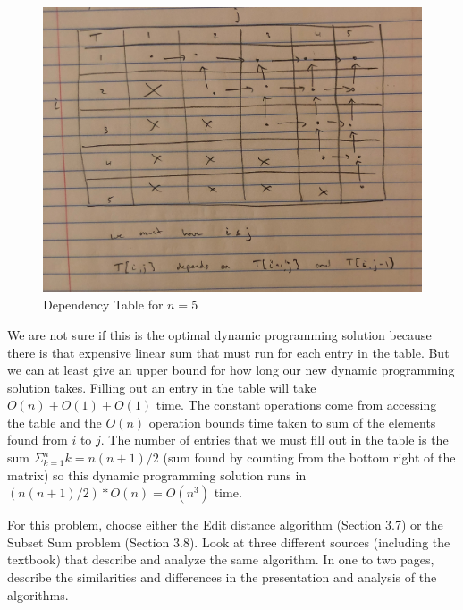 \documentclass{article}
\begin{document}
\begin{enumerate}
        \begin{figure}
            \begin{center}
                \includegraphics[scale=0.1]{image0}
                \caption{Dependency Table for $n=5$}
    		    \label{fig:dynprog}
            \end{center}
        \end{figure}

        We are not sure if this is the optimal dynamic programming solution because there is that expensive linear sum that must run for each entry in the table.
        But we can at least give an upper bound for how long our new dynamic programming solution takes.
        Filling out an entry in the table will take $O (n) + O(1) + O(1)$ time.
        The constant operations come from accessing the table and the $O(n)$ operation bounds time taken to sum of the elements found from $i$ to $j$.
        The number of entries that we must fill out in the table is the sum $\Sigma _{k=1}^n k = n(n+1)/2$ (sum found by counting from the bottom right of the matrix) so this dynamic programming solution runs in $(n(n+1)/2) * O (n) = O(n^3)$ time.
\end{enumerate}


\nextprob
{}

For this problem, choose either the Edit distance algorithm (Section 3.7) or the
Subset Sum problem (Section 3.8). Look at three different sources (including the
textbook) that describe
and analyze the same algorithm. In one to two pages, describe the similarities
and differences in the presentation and analysis of the algorithms.
\end{document}
